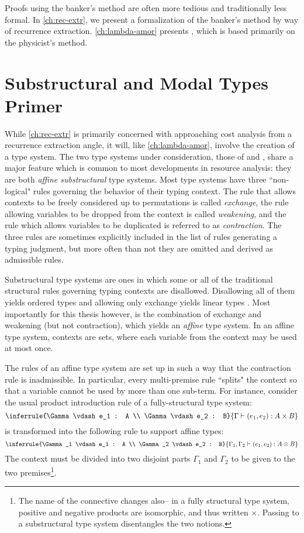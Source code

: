 Proofs using the banker's method are often more tedious and traditionally less formal. In \autoref{ch:rec-extr}, we present a formalization of the banker's method by way of recurrence extraction. \autoref{ch:lambda-amor} presents \lambdaamor, which is based primarily on the physicist's method.

\section{Substructural and Modal Types Primer}
\label{sec:modal-and-substructural}
While \autoref{ch:rec-extr} is primarily concerned with approaching cost analysis from a recurrence extraction angle, it will, like \autoref{ch:lambda-amor}, involve the creation of a type system. The two type systems under consideration, those of \lambdaA and \lambdaamor, share a major feature which is common to most developments in resource analysis: they are both \textit{affine substructural} type systems. Most type systems have three ``non-logical" rules governing the behavior of their typing context. The rule that allows contexts to be freely considered up to permutations is called \textit{exchange}, the rule allowing variables to be dropped from the context is called \textit{weakening}, and the rule which allows variables to be duplicated is referred to as \textit{contraction}. The three rules are sometimes explicitly included in the list of rules generating a typing judgment, but more often than not they are omitted and derived as admissible rules.

Substructural type systems are ones in which some or all of the traditional structural rules governing typing contexts are disallowed. Disallowing all of them yields ordered types \citehere and allowing only exchange yields linear types \citehere. Most importantly for this thesis however, is the combination of exchange and weakening (but not contraction), which yields an \textit{affine} type system. In an affine type system, contexts are sets, where each variable from the context may be used at most once.

The rules of an affine type system are set up in such a way that the contraction rule is inadmissible. In particular, every multi-premise rule ``splits" the context so that a variable cannot be used by more than one sub-term. For instance, consider the usual product introduction rule of a fully-structural type system:
$$
\inferrule{\Gamma \vdash e_1 : A \\ \Gamma \vdash e_2 : B}{\Gamma \vdash (e_1,e_2) : A \times B}
$$
is transformed into the following rule to support affine types:
$$
\inferrule{\Gamma_1 \vdash e_1 : A \\ \Gamma_2 \vdash e_2 : B}{\Gamma_1,\Gamma_2 \vdash (e_1,e_2) : A \otimes B}
$$
The context must be divided into two disjoint parts $\Gamma_1$ and $\Gamma_2$ to be given to the two premises\footnote{
The name of the connective changes also-- in a fully structural type system, positive and negative products are isomorphic, and thus written $\times$. Passing to a substructural type system disentangles the two notions.
}.

